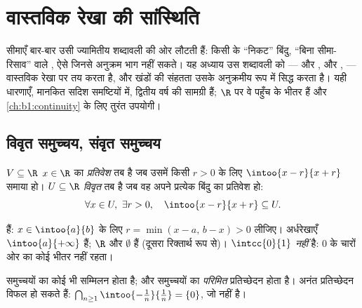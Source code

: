 \chapter{वास्तविक रेखा की सांस्थिति}\label{ch:b1:topology}

सीमाएँ बार-बार उसी ज्यामितीय शब्दावली की ओर लौटती हैं: किसी  के
``निकट'' बिंदु, ``बिना सीमा-रिसाव'' वाले , ऐसे  जिनसे अनुक्रम
भाग नहीं सकते। यह अध्याय उस शब्दावली को ---  और , 
और ,  --- वास्तविक रेखा पर तय करता है, और खंडों की संहतता उसके
अनुक्रमीय रूप में सिद्ध करता है। यही धारणाएँ, मानकित सदिश समष्टियों में,
द्वितीय वर्ष की सामग्री हैं; $\R$ पर वे पहुँच के भीतर हैं और
\cref{ch:b1:continuity} के लिए तुरंत उपयोगी।

\section{विवृत समुच्चय, संवृत समुच्चय}

\begin{definition}[प्रतिवेश, विवृत समुच्चय]\label{def:b1:topology:open}
 $V \subseteq \R$ $x \in \R$ का \emph{प्रतिवेश} तब है
जब उसमें किसी $r > 0$ के लिए  $\intoo{x - r}{x + r}$ समाया हो। 
$U \subseteq \R$ \emph{विवृत} तब है जब वह अपने प्रत्येक
बिंदु का प्रतिवेश हो:
\[
\forall x \in U,\ \exists r > 0, \quad \intoo{x - r}{x + r}
\subseteq U .
\]
\end{definition}

\begin{example}\label{ex:b1:topology:open}
   हैं: $x \in \intoo{a}{b}$ के लिए $r = \min(x - a,\, b -
x) > 0$ लीजिए। अर्धरेखाएँ $\intoo{a}{+\infty}$  हैं; $\R$ और
$\emptyset$  हैं (दूसरा रिक्तार्थ रूप से)। $\intcc{0}{1}$ 
\emph{नहीं} है: $0$ के चारों ओर का कोई  भीतर नहीं रहता।
\end{example}

\begin{proposition}[विवृत समुच्चयों का स्थायित्व]\label{prop:b1:topology:openstable}
 समुच्चयों का कोई भी सम्मिलन  होता है; और  समुच्चयों का
\emph{परिमित} प्रतिच्छेदन  होता है। अनंत प्रतिच्छेदन विफल हो सकते हैं:
$\bigcap_{n \geq 1} \intoo{-\frac 1n}{\frac 1n} = \{0\}$, जो  नहीं है।
\end{proposition}

